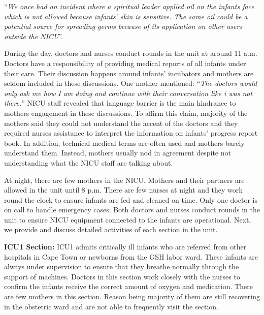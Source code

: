 \enquote{\itshape We once had an incident where a spiritual leader applied oil on the infants face which is not allowed because infants' skin is sensitive. The same oil could be a potential source for spreading germs because of its application on other users outside the NICU}. 

During the day, doctors and nurses conduct rounds in the unit at around 11 a.m. Doctors have a responsibility of providing medical reports of all infants under their care. Their discussion happens around infants' incubators and mothers are seldom included in these discussions. One mother mentioned:
\enquote{\itshape The doctors would only ask me how I am doing and continue with their conversation like i was not there.}
NICU staff revealed that language barrier is the main hindrance to mothers engagement in these discussions. To affirm this claim, majority of the mothers said they could not understand the accent of the doctors and they required nurses assistance to interpret the information on infants' progress report book. In addition, technical medical terms are often used and mothers barely understand them. Instead, mothers usually nod in agreement despite not understanding what the NICU staff are talking about.

At night, there are few mothers in the NICU. Mothers and their partners are allowed in the unit until 8 p.m. There are few nurses at night and they work round the clock to ensure infants are fed and cleaned on time. Only one doctor is on call to handle emergency cases. Both doctors and nurses conduct rounds in the unit to ensure NICU equipment connected to the infants are operational. Next, we provide and discuss detailed activities of each section in the unit. 

\textbf{ICU1 Section:} ICU1 admits critically ill infants who are referred from other hospitals in Cape Town or newborns from the GSH labor ward. These infants are always under supervision to ensure that they breathe normally through the support of machines. Doctors in this section work closely with the nurses to confirm the infants receive the correct amount of oxygen and medication. There are few mothers in this section. Reason being majority of them are still recovering in the obstetric ward and are not able to frequently visit the section. 

